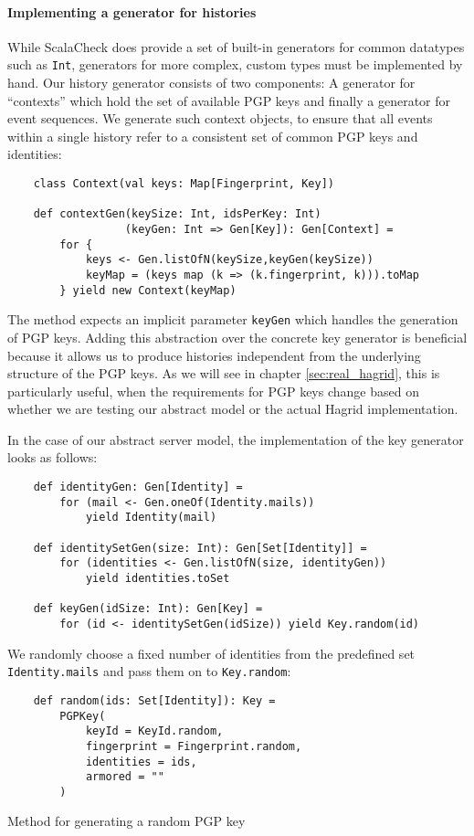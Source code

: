 \paragraph{Implementing a generator for histories} 
While ScalaCheck does provide a set of built-in generators for common datatypes such as \texttt{Int}, generators for more complex, custom types must be implemented by hand. Our history generator consists of two components: A generator for ``contexts'' which hold the set of available PGP keys and finally a generator for event sequences. 
We generate such context objects, to ensure that all events within a single history refer to a consistent set of common PGP keys and identities:
\begin{verbatim}
    class Context(val keys: Map[Fingerprint, Key])

    def contextGen(keySize: Int, idsPerKey: Int)
                  (keyGen: Int => Gen[Key]): Gen[Context] = 
        for {
            keys <- Gen.listOfN(keySize,keyGen(keySize))
            keyMap = (keys map (k => (k.fingerprint, k))).toMap
        } yield new Context(keyMap)
\end{verbatim}

The method expects an implicit parameter \texttt{keyGen} which handles the generation of PGP keys. Adding this abstraction over the concrete key generator is beneficial because it allows us to produce histories independent from the underlying structure of the PGP keys. As we will see in chapter \ref{sec:real_hagrid}, this is particularly useful, when the requirements for PGP keys change based on whether we are testing our abstract model or the actual Hagrid implementation.

In the case of our abstract server model, the implementation of the key generator looks as follows: 
\begin{code}
    \begin{verbatim}
    def identityGen: Gen[Identity] =
        for (mail <- Gen.oneOf(Identity.mails)) 
            yield Identity(mail)
    
    def identitySetGen(size: Int): Gen[Set[Identity]] =
        for (identities <- Gen.listOfN(size, identityGen)) 
            yield identities.toSet

    def keyGen(idSize: Int): Gen[Key] =
        for (id <- identitySetGen(idSize)) yield Key.random(id)
    \end{verbatim}
\end{code}

We randomly choose a fixed number of identities from the predefined set \texttt{Identity.mails} and pass them on to \texttt{Key.random}: 
\begin{code}
    \begin{verbatim}
    def random(ids: Set[Identity]): Key =
        PGPKey(
            keyId = KeyId.random,
            fingerprint = Fingerprint.random,
            identities = ids,
            armored = ""
        )
    \end{verbatim}
    \caption{Method for generating a random PGP key}
\end{code}

